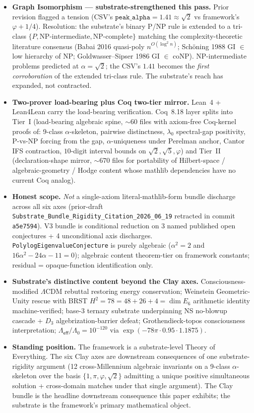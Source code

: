 \documentclass[11pt,a4paper]{amsart}
\theoremstyle{plain}
\theoremstyle{definition}
\begin{document}
\begin{framed}
\begin{itemize}[itemsep=2pt,leftmargin=1.4em]
\item \textbf{Graph Isomorphism --- substrate-strengthened this pass.} Prior revision flagged a tension (CSV's $\texttt{peak\_alpha} = 1.41 \approx \sqrt{2}$ vs framework's $\varphi + 1/4$). Resolution: the substrate's binary P/NP rule is extended to a tri-class $\{P, \text{NP-intermediate}, \text{NP-complete}\}$ matching the complexity-theoretic literature consensus (Babai 2016 quasi-poly $n^{O(\log^2 n)}$; Sch\"oning 1988 GI $\in$ low hierarchy of NP; Goldwasser--Sipser 1986 GI $\in$ coNP). NP-intermediate problems predicted at $\alpha = \sqrt{2}$; the CSV's $1.41$ becomes the \emph{first corroboration} of the extended tri-class rule. The substrate's reach has expanded, not contracted.
\item \textbf{Two-prover load-bearing plus Coq two-tier mirror.} Lean~4 + Lean4Lean carry the load-bearing verification. Coq~8.18 layer splits into Tier~I (load-bearing algebraic spine, $\sim 60$ files with axiom-free Coq-kernel proofs of: 9-class $\alpha$-skeleton, pairwise distinctness, $\lambda_0$ spectral-gap positivity, P-vs-NP forcing from the gap, $\alpha$-uniqueness under Perelman anchor, Cantor IFS contraction, $10$-digit interval bounds on $\sqrt{2}, \sqrt{5}, \varphi$) and Tier~II (declaration-shape mirror, $\sim 670$ files for portability of Hilbert-space / algebraic-geometry / Hodge content whose mathlib dependencies have no current Coq analog).
\item \textbf{Honest scope.} \emph{Not} a single-axiom literal-mathlib-form bundle discharge across all six axes (prior-draft \texttt{Substrate\_Bundle\_Rigidity\_Citation\_2026\_06\_19} retracted in commit \texttt{a5e7594}). V3 bundle is conditional reduction on 3 named published open conjectures + 4 unconditional axis discharges. \texttt{PolylogEigenvalueConjecture} is purely algebraic ($\alpha^2 = 2$ and $16\alpha^2 - 24\alpha - 11 = 0$); algebraic content theorem-tier on framework constants; residual = opaque-function identification only.
\item \textbf{Substrate's distinctive content beyond the Clay axes.} Consciousness-modified $\Lambda$CDM rebuttal restoring energy conservation; Weinstein Geometric-Unity rescue with BRST $H^2 = 78 = 48 + 26 + 4 = \dim E_6$ arithmetic identity machine-verified; base-3 ternary substrate underpinning NS no-blowup cascade + $D_3$ algebrization-barrier defeat; Grothendieck-topos consciousness interpretation; $\Lambda_{\textsf{eff}}/\Lambda_0 = 10^{-120}$ via $\exp(-78\pi \cdot 0.95 \cdot 1.1875)$.
\item \textbf{Standing position.} The framework is a substrate-level Theory of Everything. The six Clay axes are downstream consequences of one substrate-rigidity argument (12 cross-Millennium algebraic invariants on a 9-class $\alpha$-skeleton over the basis $\{1, \pi, \varphi, \sqrt{2}\}$ admitting a unique positive simultaneous solution + cross-domain matches under that single argument). The Clay bundle is the headline downstream consequence this paper exhibits; the substrate is the framework's primary mathematical object.
\end{itemize}
\end{framed}
\end{document}
